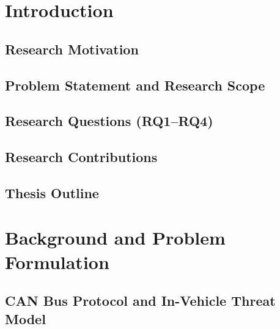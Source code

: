 \documentclass[12pt, a4paper, reqno, oneside]{book}
\begin{document}
\newpage
{}
\pagestyle{fancy}

\chapter{Introduction}
\label{chap:introduction}

\section{Research Motivation}
\label{sec:intro_motivation}

\section{Problem Statement and Research Scope}
\label{sec:intro_problem}

\section{Research Questions (RQ1--RQ4)}
\label{sec:intro_rqs}

\section{Research Contributions}
\label{sec:intro_contributions}

\section{Thesis Outline}
\label{sec:intro_outline}

\chapter{Background and Problem Formulation}
\label{chap:background}

\section{CAN Bus Protocol and In-Vehicle Threat Model}
\label{sec:bg_can_bus}
\end{document}
